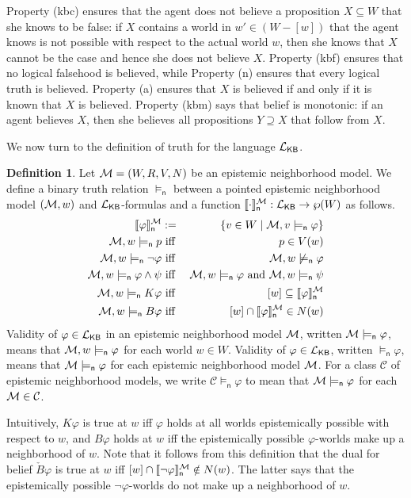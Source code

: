 \documentclass[12pt]{article}
\theoremstyle{definition}
\newtheorem{definition}[theorem]{Definition}
\newcommand{\M}{{\cal M}}      %
\newcommand{\Lang}{{\cal L}}   %
\newcommand{\KB}{{\mathsf{KB}}}                 %
\newcommand{\modelsn}{\models_{\mathsf{n}}}                  %
\newcommand{\semn}[1]{\llbracket{#1}\rrbracket_{\mathsf{n}}} %
\begin{document}
Property (kbc) ensures that the agent does not believe a proposition
$X\subseteq W$ that she knows to be false: if $X$ contains a world in
$w'\in(W-[w])$ that the agent knows is not possible with respect to
the actual world $w$, then she knows that $X$ cannot be the case and
hence she does not believe $X$.  Property (kbf) ensures that no
logical falsehood is believed, while Property (n) ensures that every
logical truth is believed.  Property (a) ensures that $X$ is believed
if and only if it is known that $X$ is believed. Property (kbm) says
that belief is monotonic: if an agent believes $X$, then she believes
all propositions $Y\supseteq X$ that follow from $X$.

We now turn to the definition of truth for the language $\Lang_\KB$.

\begin{definition} 
  Let $\M = (W,R,V,N)$ be an epistemic neighborhood model.  We define
  a binary truth relation $\modelsn$ between a pointed epistemic
  neighborhood model $(\M,w)$ and $\Lang_\KB$-formulas and a function
  $\semn{\cdot}^\M:\Lang_\KB\to \wp(W)$ as follows.
  \begin{eqnarray*} 
    \semn{\varphi}^\M & := & \{v\in W\mid \M,v\modelsn\varphi\}
    \\
    \M, w \modelsn p & \text{ iff } & p \in V(w) 
    \\
    \M, w \modelsn \neg \varphi & \text{ iff } & \M, w \not\modelsn \varphi 
    \\
    \M, w \modelsn \varphi\land\psi  & \text{ iff } 
    & \M, w \modelsn \varphi \text{ and } \M, w \modelsn \psi
    \\
    \M, w \modelsn K \varphi  & \text{ iff } & 
    [w]\subseteq\semn{\varphi}^\M
    \\
    \M, w \modelsn B \varphi  & \text{ iff } &
    [w]\cap \semn{\varphi}^\M \in N(w)
  \end{eqnarray*}
  Validity of $\varphi\in\Lang_\KB$ in an epistemic neighborhood model
  $\M$, written $\M\modelsn\varphi$, means that $\M,w\modelsn\varphi$ for
  each world $w\in W$.  Validity of $\varphi\in\Lang_\KB$, written
  $\modelsn\varphi$, means that $\M\modelsn\varphi$ for each epistemic
  neighborhood model $\M$.  For a class $\mathcal{C}$ of epistemic
  neighborhood models, we write $\mathcal{C}\modelsn\varphi$ to mean that
  $\M\modelsn\varphi$ for each $\M\in\mathcal{C}$.
\end{definition}

Intuitively, $K\varphi$ is true at $w$ iff $\varphi$ holds at all worlds
epistemically possible with respect to $w$, and $B\varphi$ holds at $w$
iff the epistemically possible $\varphi$-worlds make up a neighborhood of
$w$.  Note that it follows from this definition that the dual for
belief $\check{B} \varphi$ is true at $w$ iff
$[w]\cap\semn{\neg\varphi}^\M\notin N(w)$.  The latter says that the
epistemically possible $\lnot\varphi$-worlds do not make up a
neighborhood of $w$.
\end{document}
